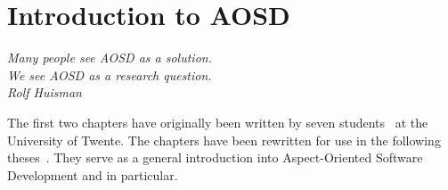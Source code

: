 \chapter{Introduction to AOSD}
\label{chp:AOSD}
\begin{flushright}
\textit{Many people see AOSD as a solution.}\\
\textit{We see AOSD as a research question.}\\
\textit{Rolf Huisman}\\
\end{flushright}

The first two chapters have originally been written by seven \MSc students~\cite{Holljen2004, Durr2004, Vinkes2004, Bosman2004, Staijen2005, Havinga2005, Boschman2006} at the University of Twente.
The chapters have been rewritten for use in the following theses~\cite{VanOudheusden2006, Conradi2006, TeWinkel2006, Huttenhuis2006, Doornenbal2006, Huisman2006, SpenkelinkD2006}.
They serve as a general introduction into Aspect-Oriented Software Development and \Compose* in particular.



